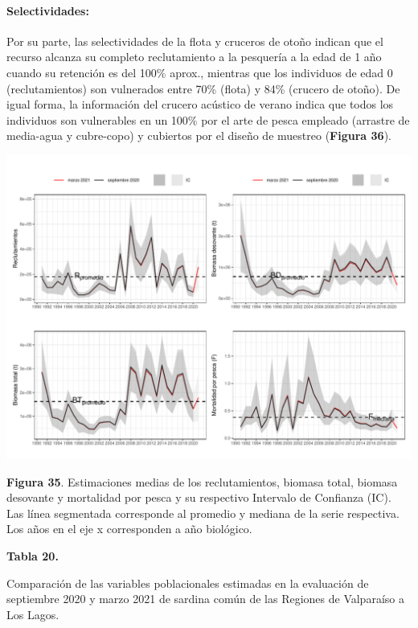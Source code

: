 \documentclass[
  spanish,
]{article}
\begin{document}
\hypertarget{selectividades}{%
\paragraph{Selectividades:}\label{selectividades}}

Por su parte, las selectividades de la flota y cruceros de otoño indican
que el recurso alcanza su completo reclutamiento a la pesquería a la
edad de 1 año cuando su retención es del 100\% aprox., mientras que los
individuos de edad 0 (reclutamientos) son vulnerados entre 70\% (flota)
y 84\% (crucero de otoño). De igual forma, la información del crucero
acústico de verano indica que todos los individuos son vulnerables en un
100\% por el arte de pesca empleado (arrastre de media-agua y
cubre-copo) y cubiertos por el diseño de muestreo (\textbf{Figura 36}).

\begin{center}\includegraphics{FigurasInforme_Marzo/F35_Varpobl-1} \end{center}

\vspace{-0.5cm}
\small

\textbf{Figura 35}. Estimaciones medias de los reclutamientos, biomasa
total, biomasa desovante y mortalidad por pesca y su respectivo
Intervalo de Confianza (IC). Las línea segmentada corresponde al
promedio y mediana de la serie respectiva. Los años en el eje x
corresponden a año biológico. \vspace{0.5cm} \normalsize

\pagebreak

\small
\begin{center} 
\textbf{Tabla 20.}
\end{center}
\begin{center} 
\vspace{-0.2cm} Comparación de las variables poblacionales  estimadas en la evaluación de septiembre 2020 y marzo 2021 de sardina común de las Regiones de Valparaíso a Los Lagos.
\end{center}
\vspace{-0.2cm}
\footnotesize
\end{document}
